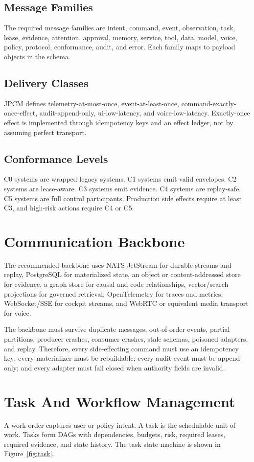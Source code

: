 \documentclass[10pt,journal,onecolumn]{IEEEtran}
\begin{document}
\subsection{Message Families}
The required message families are intent, command, event, observation, task, lease, evidence, attention, approval, memory, service, tool, data, model, voice, policy, protocol, conformance, audit, and error. Each family maps to payload objects in the schema.

\subsection{Delivery Classes}
JPCM defines telemetry-at-most-once, event-at-least-once, command-exactly-once-effect, audit-append-only, ui-low-latency, and voice-low-latency. Exactly-once effect is implemented through idempotency keys and an effect ledger, not by assuming perfect transport.

\subsection{Conformance Levels}
C0 systems are wrapped legacy systems. C1 systems emit valid envelopes. C2 systems are lease-aware. C3 systems emit evidence. C4 systems are replay-safe. C5 systems are full control participants. Production side effects require at least C3, and high-risk actions require C4 or C5.

\section{Communication Backbone}
The recommended backbone uses NATS JetStream for durable streams and replay, PostgreSQL for materialized state, an object or content-addressed store for evidence, a graph store for causal and code relationships, vector/search projections for governed retrieval, OpenTelemetry for traces and metrics, WebSocket/SSE for cockpit streams, and WebRTC or equivalent media transport for voice.

The backbone must survive duplicate messages, out-of-order events, partial partitions, producer crashes, consumer crashes, stale schemas, poisoned adapters, and replay. Therefore, every side-effecting command must use an idempotency key; every materializer must be rebuildable; every audit event must be append-only; and every adapter must fail closed when authority fields are invalid.

\section{Task And Workflow Management}
A work order captures user or policy intent. A task is the schedulable unit of work. Tasks form DAGs with dependencies, budgets, risk, required leases, required evidence, and state history. The task state machine is shown in Figure~\ref{fig:task}.
\end{document}
